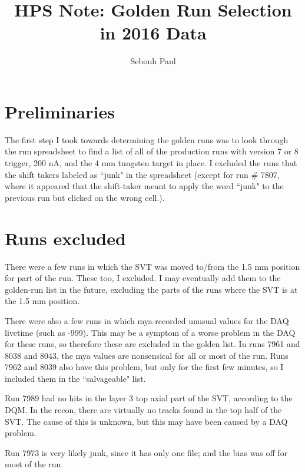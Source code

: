 \documentclass[11pt]{article}
\title{HPS Note:  Golden Run Selection in 2016 Data}
\author{Sebouh Paul}
\date{}                                           %
\begin{document}
\maketitle

\section{Preliminaries}
The first step I took towards determining the golden runs was to look through the run spreadsheet to find a list of all of the production runs with version 7 or 8 trigger, 200 nA, and the 4 mm tungsten target in place.  I excluded the runs that the shift takers labeled as ``junk" in the spreadsheet (except for run \# 7807, where it appeared that the shift-taker meant to apply the word ``junk" to the previous run but clicked on the wrong cell.).  




\section{Runs excluded}
There were a few runs in which the SVT was moved to/from the 1.5 mm position for part of the run.  These too, I excluded.  I may eventually add them to the golden-run list in the future, excluding the parts of the runs where the SVT is at the 1.5 mm position.  

There were also a few runs in which mya-recorded unusual values for the DAQ livetime (such as -999).  This may be a symptom of a worse problem in the DAQ for these runs, so therefore these are excluded in the golden list.  In runs 7961 and 8038 and 8043, the mya values are nonsensical for all or most of the run.  Runs 7962 and 8039 also have this problem, but only for the first few minutes, so I included them in the ``salvageable" list.  

Run 7989 had no hits in the layer 3 top axial part of the SVT, according to the DQM.  In the recon, there are virtually no tracks found in the top half of the SVT.  The cause of this is unknown, but this may have been caused by a DAQ problem.  

Run 7973 is very likely junk, since it has only one file; and the bias was off for most of the run.  
\end{document}
